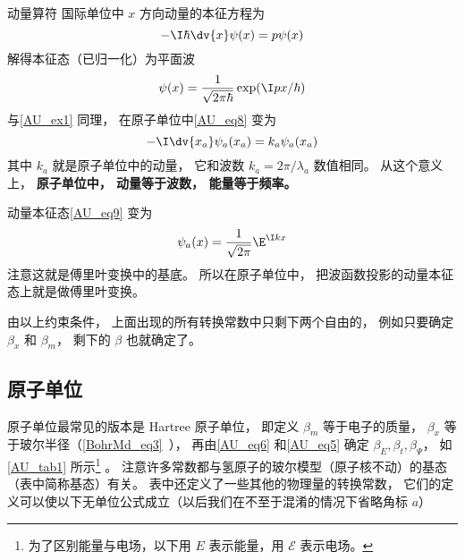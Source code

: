\begin{example}{动量算符}\label{AU_ex2}
国际单位中 $x$ 方向动量的本征方程为
\begin{equation}\label{AU_eq8}
-\I\hbar \dv{x} \psi(x) = p \psi(x)
\end{equation}
解得本征态（已归一化）为平面波
\begin{equation}\label{AU_eq9}
\psi(x) = \frac{1}{\sqrt{2\pi\hbar}}\exp(\I p x/\hbar)
\end{equation}
与\autoref{AU_ex1} 同理， 在原子单位中\autoref{AU_eq8} 变为
\begin{equation}
-\I\dv{x_a} \psi_a(x_a) = k_a \psi_a(x_a)
\end{equation}
其中 $k_a$ 就是原子单位中的动量， 它和波数 $k_a = 2\pi/\lambda_a$ 数值相同。 从这个意义上， \textbf{原子单位中， 动量等于波数， 能量等于频率。}

动量本征态\autoref{AU_eq9} 变为
\begin{equation}
\psi_a(x) = \frac{1}{\sqrt{2\pi}}\E^{\I kx}
\end{equation}
注意这就是傅里叶变换中的基底。 所以在原子单位中， 把波函数投影的动量本征态上就是做傅里叶变换。
\end{example}

由以上约束条件， 上面出现的所有转换常数中只剩下两个自由的， 例如只要确定 $\beta_x$ 和 $\beta_m$， 剩下的 $\beta$ 也就确定了。

\subsection{原子单位}
原子单位最常见的版本是 Hartree 原子单位， 即定义 $\beta_m$ 等于电子的质量， $\beta_x$ 等于玻尔半径（\autoref{BohrMd_eq3}~）， 再由\autoref{AU_eq6} 和\autoref{AU_eq5} 确定 $\beta_E, \beta_t, \beta_\Psi$， 如\autoref{AU_tab1} 所示\footnote{为了区别能量与电场，以下用 $E$ 表示能量，用 $\mathcal{E}$ 表示电场。} 。 注意许多常数都与氢原子的玻尔模型（原子核不动）的基态（表中简称基态）有关。 表中还定义了一些其他的物理量的转换常数， 它们的定义可以使以下无单位公式成立（以后我们在不至于混淆的情况下省略角标 $a$）

